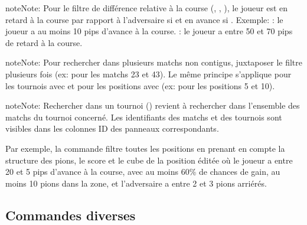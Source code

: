 \documentclass[letterpaper,10pt,french]{sphinxmanual}
\begin{document}
\begin{sphinxadmonition}{note}{Note:}
\sphinxAtStartPar
Pour le filtre de différence relative à la course (, ,
), le joueur est en retard à la course par rapport à l’adversaire si
 et en avance si . Exemple:  : le joueur a au moins 10 pips
d’avance à la course.  : le joueur a entre 50 et 70 pips de retard à
la course.
\end{sphinxadmonition}

\begin{sphinxadmonition}{note}{Note:}
\sphinxAtStartPar
Pour rechercher dans plusieurs matchs non contigus, juxtaposer le
filtre  plusieurs fois (ex:  pour les matchs 23 et 43).
Le même principe s’applique pour les tournois avec  et pour les
positions avec  (ex:  pour les positions 5 et 10).
\end{sphinxadmonition}

\begin{sphinxadmonition}{note}{Note:}
\sphinxAtStartPar
Rechercher dans un tournoi () revient à rechercher dans
l’ensemble des matchs du tournoi concerné. Les identifiants des matchs et des
tournois sont visibles dans les colonnes ID des panneaux correspondants.
\end{sphinxadmonition}

\sphinxAtStartPar
Par exemple, la commande  filtre toutes les
positions en prenant en compte la structure des pions, le score et le cube
de la position éditée où le joueur a entre 20 et 5 pips d’avance à la
course, avec au moins 60\% de chances de gain, au moins 10 pions dans la
zone, et l’adversaire a entre 2 et 3 pions arriérés.


\subsection{Commandes diverses}
\label{\detokenize{cmd_mode:commandes-diverses}}\label{\detokenize{cmd_mode:cmd-misc}}
\end{document}
